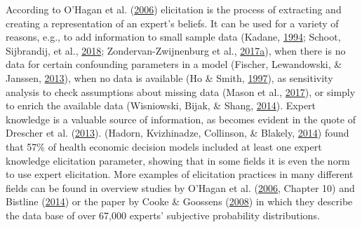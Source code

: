 \documentclass[openright,titlepage,12pt,a4paper]{book}
\begin{document}
According to O'Hagan et al. (\protect\hyperlink{ref-ohagan_uncertain_2006}{2006}) elicitation is the process of extracting and creating a representation of an expert's beliefs. It can be used for a variety of reasons, e.g., to add information to small sample data (Kadane, \protect\hyperlink{ref-kadane_application_1994}{1994}; Schoot, Sijbrandij, et al., \protect\hyperlink{ref-van_de_schoot_bayesian_2018}{2018}; Zondervan-Zwijnenburg et al., \protect\hyperlink{ref-zondervan-zwijnenburg_where_2017}{2017}\protect\hyperlink{ref-zondervan-zwijnenburg_where_2017}{a}), when there is no data for certain confounding parameters in a model (Fischer, Lewandowski, \& Janssen, \protect\hyperlink{ref-fischer_estimating_2013}{2013}), when no data is available (Ho \& Smith, \protect\hyperlink{ref-ho_volcanic_1997}{1997}), as sensitivity analysis to check assumptions about missing data (Mason et al., \protect\hyperlink{ref-mason_development_2017}{2017}), or simply to enrich the available data (Wisniowski, Bijak, \& Shang, \protect\hyperlink{ref-wisniowski_forecasting_2014}{2014}). Expert knowledge is a valuable source of information, as becomes evident in the quote of Drescher et al. (\protect\hyperlink{ref-drescher_toward_2013}{2013}). (Hadorn, Kvizhinadze, Collinson, \& Blakely, \protect\hyperlink{ref-hadorn_useof_2014}{2014}) found that 57\% of health economic decision models included at least one expert knowledge elicitation parameter, showing that in some fields it is even the norm to use expert elicitation. More examples of elicitation practices in many different fields can be found in overview studies by O'Hagan et al. (\protect\hyperlink{ref-ohagan_uncertain_2006}{2006}, Chapter 10) and Bistline (\protect\hyperlink{ref-bistline_energy_2014}{2014}) or the paper by Cooke \& Goossens (\protect\hyperlink{ref-cooke_tu_2008}{2008}) in which they describe the data base of over 67,000 experts' subjective probability distributions.
\end{document}
